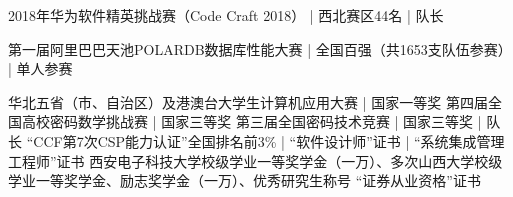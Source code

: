 \documentclass[zh]{resume}
\begin{document}
\begin{entries}

    {2018年华为软件精英挑战赛（Code Craft 2018）  \quad | \quad 西北赛区44名  \quad | \quad 队长}%

    {第一届阿里巴巴天池POLARDB数据库性能大赛  \quad | \quad 全国百强（共1653支队伍参赛）  \quad | \quad 单人参赛}%

    {华北五省（市、自治区）及港澳台大学生计算机应用大赛  \quad | \quad 国家一等奖 }%
    {第四届全国高校密码数学挑战赛  \quad | \quad 国家三等奖}%
    {第三届全国密码技术竞赛  \quad | \quad 国家三等奖  \quad | \quad 队长  \quad {}}%
    {“CCF第7次CSP能力认证”全国排名前3\% | “软件设计师”证书 | “系统集成管理工程师”证书}
    {西安电子科技大学校级学业一等奖学金（一万）、多次山西大学校级学业一等奖学金、励志奖学金（一万）、优秀研究生称号}
    {“证券从业资格”证书}
\end{entries}
\end{document}
